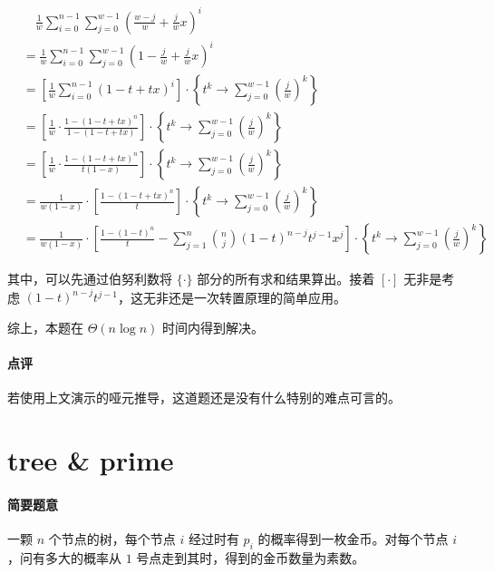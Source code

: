 \documentclass[12pt]{ctexart}
\theoremstyle{theorem}
\theoremstyle{theorem}
\begin{document}
\begin{align*}
&\quad \frac 1w\sum_{i=0}^{n-1} \sum_{j=0}^{w-1} \left(\frac {w-j}w + \frac jw x\right)^i\\
&= \frac 1w\sum_{i=0}^{n-1} \sum_{j=0}^{w-1} \left(1 - \frac jw + \frac jw x\right)^i\\
&= \left[\frac 1w\sum_{i=0}^{n-1} \left(1 - t + t x\right)^i\right] \cdot \left\{ t^k \rightarrow \sum_{j=0}^{w-1} \left(\frac j w\right)^k \right\}\\
&= \left[\frac 1w \cdot \frac{1 - \left(1 - t + t x\right)^n}{1 -  \left(1 - t + t x\right)} \right] \cdot \left\{ t^k \rightarrow \sum_{j=0}^{w-1} \left(\frac j w\right)^k \right\}\\
&= \left[\frac 1w \cdot \frac{1 - \left(1 - t + t x\right)^n}{t(1-x)} \right] \cdot \left\{ t^k \rightarrow \sum_{j=0}^{w-1} \left(\frac j w\right)^k \right\}\\
&= \frac 1{w(1-x)} \cdot \left[\frac{1 - \left(1 - t + t x\right)^n}{t} \right] \cdot \left\{ t^k \rightarrow \sum_{j=0}^{w-1} \left(\frac j w\right)^k \right\}\\
&= \frac 1{w(1-x)} \cdot \left[\frac{1 - \left(1 - t\right)^n}{t} - \sum_{j=1}^n \binom n j (1-t)^{n-j}t^{j-1} x^j \right] \cdot \left\{ t^k \rightarrow \sum_{j=0}^{w-1} \left(\frac j w\right)^k \right\}
\end{align*}

其中，可以先通过伯努利数将 $\{\cdot \}$ 部分的所有求和结果算出。接着 $[ \cdot ]$ 无非是考虑 $(1-t)^{n-j}t^{j-1}$，这无非还是一次转置原理的简单应用。

综上，本题在 $\Theta(n\log n)$ 时间内得到解决。

\paragraph{点评} 若使用上文演示的哑元推导，这道题还是没有什么特别的难点可言的。

\newpage

\section{tree \& prime}

\paragraph{简要题意}

一颗 $n$ 个节点的树，每个节点 $i$ 经过时有 $p_i$ 的概率得到一枚金币。对每个节点 $i$，问有多大的概率从 $1$ 号点走到其时，得到的金币数量为素数。
\end{document}
